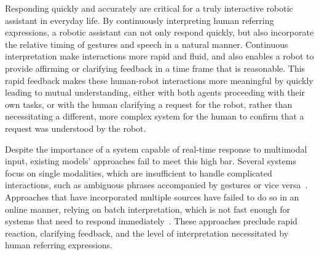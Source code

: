 \documentclass[a4paper, 11pt]{article} %
\begin{document}
Responding quickly and accurately are critical for a truly interactive robotic assistant in everyday life. By continuously interpreting human referring expressions, a robotic assistant can not only respond quickly, but also incorporate the relative timing of gestures and speech in a natural manner. Continuous interpretation make interactions more rapid and fluid, and also enables a robot to provide affirming or clarifying feedback in a time frame that is reasonable. This rapid feedback makes these human-robot interactions more meaningful by quickly leading to mutual understanding, either with both agents proceeding with their own tasks, or with the human clarifying a request for the robot, rather than necessitating a different, more complex system for the human to confirm that a request was understood by the robot.

Despite the importance of a system capable of real-time response to multimodal input, existing models' approaches fail to meet this high bar. Several systems focus on single modalities, which are insufficient to handle complicated interactions, such as ambiguous phrases accompanied by gestures or vice versa~\citep{kollar10, tellex11}. Approaches that have incorporated multiple sources have failed to do so in an online manner, relying on batch interpretation, which is not fast enough for systems that need to respond immediately~\citep{matuszek14}. These approaches preclude rapid reaction, clarifying feedback, and the level of interpretation necessitated by human referring expressions.
\end{document}
